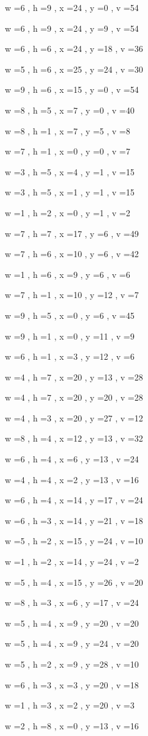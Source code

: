 \documentclass[11pt]{article}
\begin{document}
w =6 , h =9 , x =24 , y =0 , v =54
\par
w =6 , h =9 , x =24 , y =9 , v =54
\par
w =6 , h =6 , x =24 , y =18 , v =36
\par
w =5 , h =6 , x =25 , y =24 , v =30
\par
w =9 , h =6 , x =15 , y =0 , v =54
\par
w =8 , h =5 , x =7 , y =0 , v =40
\par
w =8 , h =1 , x =7 , y =5 , v =8
\par
w =7 , h =1 , x =0 , y =0 , v =7
\par
w =3 , h =5 , x =4 , y =1 , v =15
\par
w =3 , h =5 , x =1 , y =1 , v =15
\par
w =1 , h =2 , x =0 , y =1 , v =2
\par
w =7 , h =7 , x =17 , y =6 , v =49
\par
w =7 , h =6 , x =10 , y =6 , v =42
\par
w =1 , h =6 , x =9 , y =6 , v =6
\par
w =7 , h =1 , x =10 , y =12 , v =7
\par
w =9 , h =5 , x =0 , y =6 , v =45
\par
w =9 , h =1 , x =0 , y =11 , v =9
\par
w =6 , h =1 , x =3 , y =12 , v =6
\par
w =4 , h =7 , x =20 , y =13 , v =28
\par
w =4 , h =7 , x =20 , y =20 , v =28
\par
w =4 , h =3 , x =20 , y =27 , v =12
\par
w =8 , h =4 , x =12 , y =13 , v =32
\par
w =6 , h =4 , x =6 , y =13 , v =24
\par
w =4 , h =4 , x =2 , y =13 , v =16
\par
w =6 , h =4 , x =14 , y =17 , v =24
\par
w =6 , h =3 , x =14 , y =21 , v =18
\par
w =5 , h =2 , x =15 , y =24 , v =10
\par
w =1 , h =2 , x =14 , y =24 , v =2
\par
w =5 , h =4 , x =15 , y =26 , v =20
\par
w =8 , h =3 , x =6 , y =17 , v =24
\par
w =5 , h =4 , x =9 , y =20 , v =20
\par
w =5 , h =4 , x =9 , y =24 , v =20
\par
w =5 , h =2 , x =9 , y =28 , v =10
\par
w =6 , h =3 , x =3 , y =20 , v =18
\par
w =1 , h =3 , x =2 , y =20 , v =3
\par
w =2 , h =8 , x =0 , y =13 , v =16
\par
\newpage
\end{document}
